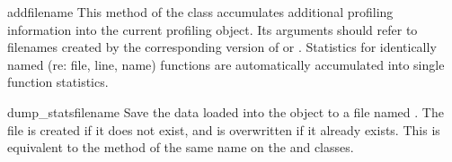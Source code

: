 \begin{methoddesc}[Stats]{add}{filename\optional{, \moreargs}}
This method of the  class accumulates additional
profiling information into the current profiling object.  Its
arguments should refer to filenames created by the corresponding
version of  or .
Statistics for identically named
(re: file, line, name) functions are automatically accumulated into
single function statistics.
\end{methoddesc}

\begin{methoddesc}[Stats]{dump_stats}{filename}
Save the data loaded into the  object to a file named
.  The file is created if it does not exist, and is
overwritten if it already exists.  This is equivalent to the method of
the same name on the  and
 classes.
\end{methoddesc}

